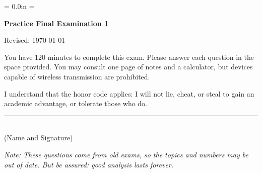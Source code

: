 \documentclass[letterpaper,12pt]{exam}
\def\HeadName{Practice Final Examination 1}
\begin{document}
\parindent = 0.0in
\parskip = \bigskipamount
\thispagestyle{empty}%
\Head

\centerline{\large \bf \HeadName}%
\centerline{Revised:  \today}

\bigskip
You have 120 minutes to complete this exam.  Please answer each
question in the space provided. You may consult one page of notes
and a calculator, but devices capable of wireless transmission are
prohibited.

I understand that the honor code applies: I will not lie, cheat,
or steal to gain an academic advantage, or tolerate those who do.

\begin{flushright}
\rule{4in}{0.5pt} \\ (Name and Signature)
\end{flushright}

{\it Note:  These questions come from old exams,
so the topics and numbers may be out of date.
But be assured:  good analysis lasts forever.}
\end{document}

